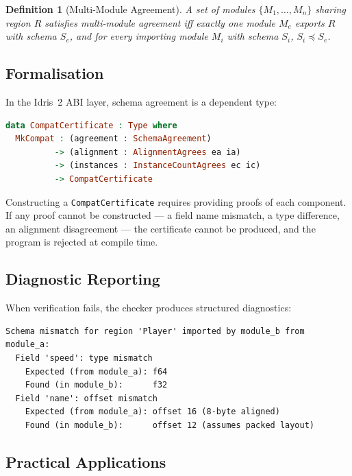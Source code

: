 \documentclass[11pt,a4paper]{article}
\newtheorem{definition}{Definition}
\begin{document}
\begin{definition}[Multi-Module Agreement]
\label{def:multimodule}
A set of modules $\{M_1, \ldots, M_n\}$ sharing region $R$ satisfies
multi-module agreement iff exactly one module $M_e$ exports $R$ with
schema $S_e$, and for every importing module $M_i$ with schema $S_i$,
$S_i \preceq S_e$.
\end{definition}

\subsection{Formalisation}
\label{sec:formalisation}

In the Idris~2 ABI layer, schema agreement is a dependent type:

\begin{lstlisting}[language=Idris]
data CompatCertificate : Type where
  MkCompat : (agreement : SchemaAgreement)
          -> (alignment : AlignmentAgrees ea ia)
          -> (instances : InstanceCountAgrees ec ic)
          -> CompatCertificate
\end{lstlisting}

Constructing a \lstinline{CompatCertificate} requires providing proofs
of each component.  If any proof cannot be constructed --- a field name
mismatch, a type difference, an alignment disagreement --- the
certificate cannot be produced, and the program is rejected at compile
time.

\subsection{Diagnostic Reporting}
\label{sec:diagnostics}

When verification fails, the checker produces structured diagnostics:

\begin{lstlisting}[basicstyle=\ttfamily\small,language={}]
Schema mismatch for region 'Player' imported by module_b from module_a:
  Field 'speed': type mismatch
    Expected (from module_a): f64
    Found (in module_b):      f32
  Field 'name': offset mismatch
    Expected (from module_a): offset 16 (8-byte aligned)
    Found (in module_b):      offset 12 (assumes packed layout)
\end{lstlisting}

\subsection{Practical Applications}
\label{sec:applications}
\end{document}
